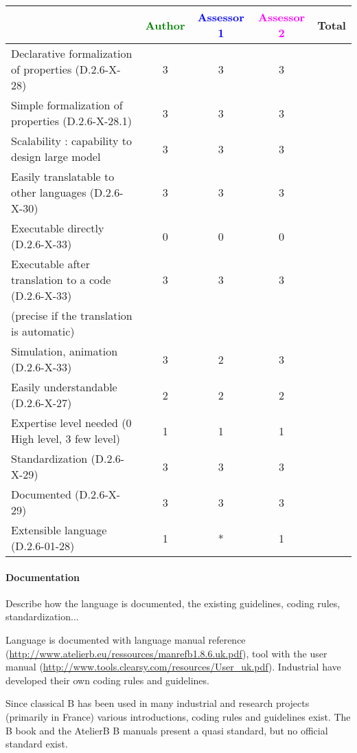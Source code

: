\begin{tabular}{|l | c | c | c | c|}
\hline
& \textcolor{green}{Author} & \textcolor{blue}{Assessor 1} & \textcolor{magenta}{Assessor 2} & Total \\
\hline
Declarative formalization of properties (D.2.6-X-28) & 3 & 3 & 3 & \\
\hline
Simple formalization of properties (D.2.6-X-28.1) & 3 & 3 & 3 & \\
\hline
Scalability : capability to design large model & 3 & 3 & 3 & \\
\hline
Easily translatable to other languages (D.2.6-X-30) & 3 & 3 & 3 & \\
\hline
Executable directly (D.2.6-X-33) & 0 & 0 & 0 & \\
\hline
Executable after translation to a code (D.2.6-X-33) & 3 & 3 & 3 & \\
(precise if the translation is automatic) & & & & \\
\hline
Simulation, animation (D.2.6-X-33) &  3 & 2 & 3 & \\
\hline
Easily understandable (D.2.6-X-27) & 2 & 2 & 2 & \\
\hline
Expertise level needed (0 High level, 3 few level) &  1 & 1 & 1 & \\
\hline
Standardization (D.2.6-X-29) & 3 & 3 & 3 & \\
\hline
Documented (D.2.6-X-29) & 3 & 3 & 3 & \\
\hline
Extensible language (D.2.6-01-28) & 1 & * & 1 & \\
\hline
\end{tabular}


\paragraph{Documentation} Describe how the language is documented, the existing guidelines, coding rules, standardization...

\begin{author_comment}

Language is documented with language manual reference (\url{http://www.atelierb.eu/ressources/manrefb1.8.6.uk.pdf}), tool with the user manual (\url{http://www.tools.clearsy.com/resources/User_uk.pdf}). Industrial have developed their own coding rules and guidelines.
\end{author_comment}

\begin{assessor2}
Since classical B has been used in many industrial and research projects (primarily in France) various introductions, coding rules and guidelines exist. The B book and the AtelierB B manuals present a quasi standard, but no official standard exist.
\end{assessor2}

